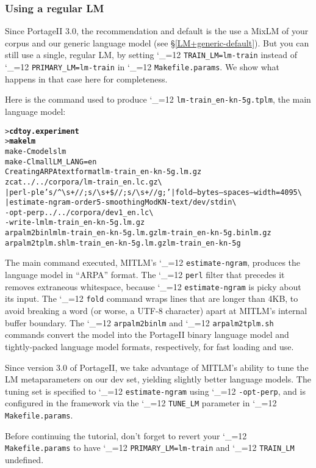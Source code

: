 \documentclass[11pt,letterpaper]{article}
\newcommand{\bs}{\textbackslash{}}
\newcommand{\PS}{PortageII\xspace}
\def\code{\begingroup\catcode`\_=12 \codex}
\newcommand{\codex}[1]{\texttt{#1}\endgroup}
\begin{document}
\subsubsection{Using a regular LM} \label{regularLM}

Since \PS 3.0, the recommendation and default is the use a MixLM of your
corpus and our generic language model (see \S\ref{LM+generic-default}).
But you can still use a single, regular LM, by setting
\code{TRAIN_LM=lm-train} instead of \code{PRIMARY_LM=lm-train} in
\code{Makefile.params}. We show what happens in that case here for
completeness.

Here is the command used to produce
\code{lm-train_en-kn-5g.tplm},
the main language model:
\begin{small}
\begin{alltt}
   > \textbf{cd toy.experiment}
   > \textbf{make lm}
   make -C models lm
   make -C lm all LM_LANG=en
   Creating ARPA text format lm-train_en-kn-5g.lm.gz
   zcat ../../corpora/lm-train_en.lc.gz \bs
      | perl -ple 's/^{\bs}s+//; s/{\bs}s+\$//; s/{\bs}s+/ /g;' | fold --bytes --spaces --width=4095 \bs
      | estimate-ngram -order 5 -smoothing ModKN -text /dev/stdin \bs
        -opt-perp ../../corpora/dev1_en.lc \bs
        -write-lm lm-train_en-kn-5g.lm.gz
   arpalm2binlm lm-train_en-kn-5g.lm.gz lm-train_en-kn-5g.binlm.gz
   arpalm2tplm.sh lm-train_en-kn-5g.lm.gz lm-train_en-kn-5g
\end{alltt}
\end{small}
The main command executed, MITLM's \code{estimate-ngram}, produces the language
model in ``ARPA'' format.  The \code{perl} filter that precedes it
removes extraneous whitespace, because \code{estimate-ngram} is picky about its
input.  The \code{fold} command wraps lines that are longer than 4KB, to avoid
breaking a word (or worse, a UTF-8 character) apart at MITLM's internal buffer
boundary.  The \code{arpalm2binlm} and \code{arpalm2tplm.sh} commands
convert the model into the \PS binary language model and
tightly-packed language model formats, respectively, for fast loading and use.

Since version 3.0 of \PS, we take advantage of MITLM's ability to tune the LM
metaparameters on our dev set, yielding slightly better language models.  The
tuning set is specified to \code{estimate-ngram} using \code{-opt-perp}, and is
configured in the framework via the \code{TUNE_LM} parameter in
\code{Makefile.params}.

Before continuing the tutorial, don't forget to revert your
\code{Makefile.params} to have \code{PRIMARY_LM=lm-train} and \code{TRAIN_LM}
undefined.
\end{document}
